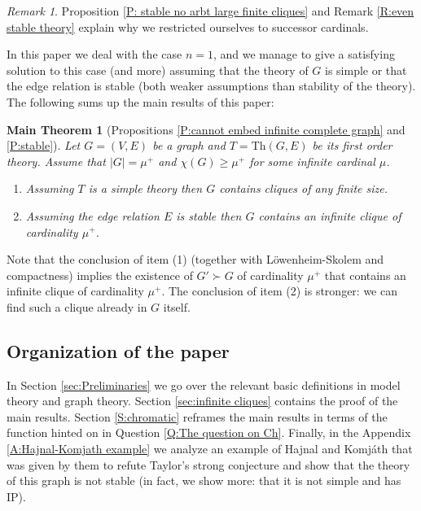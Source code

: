 \documentclass[a4paper]{amsart}
\theoremstyle{plain}
\newtheorem{maintheorem}[theorem]{Main Theorem}
\theoremstyle{definition}
\theoremstyle{remark}
\newtheorem{remark}[theorem]{Remark}
\numberwithin{equation}{section}
\newcommand{\Sh}{\text{Sh}}
\begin{document}
\begin{remark}
  Proposition \ref{P: stable no arbt large finite cliques} and Remark \ref{R:even stable theory} explain why we restricted ourselves to successor cardinals. 
\end{remark}

In this paper we deal with the case $n=1$, and we manage to give a satisfying solution to this case (and more) assuming that the theory of $G$ is simple or that the edge relation is stable (both weaker assumptions than stability of the theory). 
The following sums up the main results of this paper: 

\begin{maintheorem}[Propositions \ref{P:cannot embed infinite complete graph} and \ref{P:stable}]
  Let $G=(V,E)$ be a graph and $T=\mathrm{Th}(G,E)$ be its first order theory. Assume that $|G|=\mu^+$ and $\chi(G)\geq \mu^+$ for some infinite cardinal $\mu$.
  
  \begin{enumerate}
  \item Assuming $T$ is a simple theory then $G$ contains cliques of any finite size. 
  \item Assuming the edge relation $E$ is stable then $G$ contains an infinite clique of cardinality $\mu^+$.
  \end{enumerate}
  \end{maintheorem}

Note that the conclusion of item (1) (together with L\"owenheim-Skolem and compactness) implies the existence of $G'\succ G$ of cardinality $\mu^+$ that contains an infinite clique of cardinality $\mu^+$. The conclusion of item (2) is stronger: we can find such a clique already in $G$ itself.

\subsection{Organization of the paper} In Section \ref{sec:Preliminaries} we go over the relevant basic definitions in model theory and graph theory. Section \ref{sec:infinite cliques} contains the proof of the main results. Section \ref{S:chromatic} reframes the main results in terms of the function hinted on in Question \ref{Q:The question on Ch}. Finally, in the Appendix \ref{A:Hajnal-Komjath example} we analyze an example of Hajnal and Komj\'{a}th that was given by them to refute Taylor's strong conjecture and show that the theory of this graph is not stable (in fact, we show more: that it is not simple and has IP).
\end{document}
